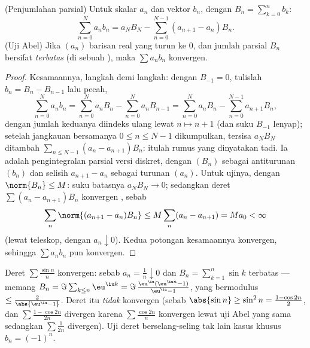 \begin{theorem}\label{thm:b2:series:abel}
(Penjumlahan parsial) Untuk skalar $a_n$ dan vektor $b_n$, dengan $B_n
= \sum_{k=0}^{n} b_k$:
\[
\sum_{n=0}^{N} a_n b_n
= a_N B_N - \sum_{n=0}^{N-1} (a_{n+1} - a_n) B_n .
\]
(Uji Abel) Jika $(a_n)$ barisan real yang turun ke $0$, dan
jumlah parsial $B_n$ bersifat \emph{terbatas} (di sebuah ),
maka $\sum a_n b_n$ konvergen.
\end{theorem}

\begin{proof}
Kesamaannya, langkah demi langkah: dengan $B_{-1} = 0$, tulislah $b_n =
B_n - B_{n-1}$ lalu pecah,
\[
\sum_{n=0}^{N} a_nb_n
= \sum_{n=0}^{N} a_nB_n - \sum_{n=0}^{N} a_nB_{n-1}
= \sum_{n=0}^{N} a_nB_n - \sum_{n=0}^{N-1} a_{n+1}B_{n} ,
\]
dengan jumlah keduanya diindeks ulang lewat $n \mapsto n + 1$ (dan suku
$B_{-1}$ lenyap); setelah jangkauan bersamanya $0 \leq n \leq N-1$
dikumpulkan, tersisa $a_NB_N$ ditambah $\sum_{n\leq N-1}(a_n -
a_{n+1})B_n$: itulah rumus yang dinyatakan tadi. Ia adalah pengintegralan
parsial versi diskret, dengan $(B_n)$ sebagai antiturunan $(b_n)$ dan
selisih $a_{n+1} - a_n$ sebagai turunan $(a_n)$. Untuk ujinya, dengan
$\norm{B_n} \leq M$: suku batasnya $a_N B_N \to 0$; sedangkan deret
$\sum (a_n - a_{n+1})B_n$ konvergen , sebab
\[
\sum_n \norm{(a_{n+1} - a_n)B_n} \leq M \sum_n (a_n - a_{n+1})
= M a_0 < \infty
\]
(lewat teleskop, dengan $a_n \downarrow 0$). Kedua potongan kesamaannya
konvergen, sehingga $\sum a_n b_n$ pun konvergen.
\end{proof}

\begin{example}\label{ex:b2:series:sinn}
Deret $\sum \frac{\sin n}{n}$ konvergen: sebab $a_n = \frac1n
\downarrow 0$ dan $B_n = \sum_{k=1}^{n} \sin k$ terbatas --- memang $B_n
= \Im\sum_{k \leq n} \eu^{\iu k} = \Im\,\frac{\eu^{\iu}(\eu^{\iu n} -
1)}{\eu^{\iu} - 1}$, yang bermodulus $\leq \frac{2}{\abs{\eu^{\iu} -
1}}$. Deret itu \emph{tidak} konvergen  (sebab $\abs{\sin n} \geq
\sin^2 n = \frac{1 - \cos 2n}{2}$, dan $\sum \frac{1 - \cos 2n}{2n}$
divergen karena $\sum \frac{\cos 2n}{n}$ konvergen lewat uji Abel yang
sama sedangkan $\sum \frac{1}{2n}$ divergen). Uji deret
berselang-seling tak lain kasus khusus $b_n = (-1)^n$.
\end{example}

